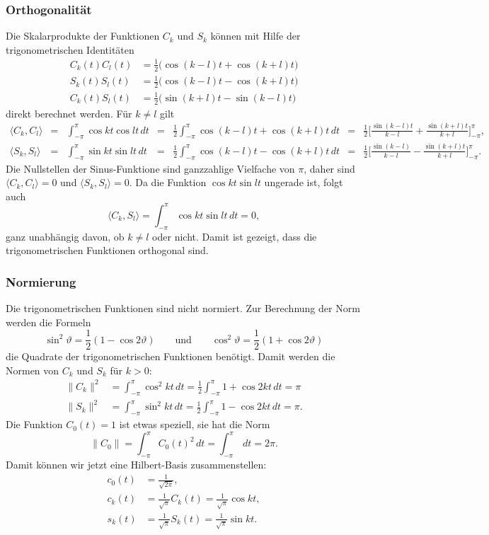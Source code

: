 \subsubsection{Orthogonalität}
Die Skalarprodukte der Funktionen $C_k$ und $S_k$ können mit Hilfe
der trigonometrischen Identitäten
\begin{align*}
C_k(t)C_l(t)
&=
\frac12\bigl(\cos(k-l)t+\cos(k+l)t\bigr)
\\
S_k(t)S_l(t)
&=
\frac12\bigl(\cos(k-l)t-\cos(k+l)t\bigr)
\\
C_k(t)S_l(t)
&=
\frac12\bigl(\sin(k+l)t-\sin(k-l)t\bigr)
\end{align*}
direkt berechnet werden.
Für $k\ne l$ gilt
\[
\renewcommand\arraycolsep{2pt}
\renewcommand\arraystretch{2.2}
\begin{array}{lclclcl}
\langle C_k,C_l\rangle
&=&
\displaystyle
\int_{-\pi}^\pi \cos kt\cos lt\,dt
&=&
\displaystyle
\frac12
\int_{-\pi}^\pi \cos(k-l)t+\cos(k+l)t\,dt
&=&
\displaystyle
\frac12\biggl[
\frac{\sin(k-l)t}{k-l} + \frac{\sin(k+l)t}{k+l}
\biggr]_{-\pi}^\pi,
\\
\langle S_k,S_l\rangle
&=&
\displaystyle
\int_{-\pi}^\pi \sin kt\sin lt\,dt
&=&
\displaystyle
\frac12
\int_{-\pi}^\pi \cos(k-l)t-\cos(k+l)t\,dt
&=&
\displaystyle
\frac12
\biggl[
\frac{\sin(k-l)}{k-l}-\frac{\sin(k+l)t}{k+l}
\biggr]_{-\pi}^\pi.
\end{array}
\]
Die Nullstellen der Sinus-Funktione sind ganzzahlige Vielfache von $\pi$,
daher sind $\langle C_k,C_l\rangle=0$ und $\langle S_k,S_l\rangle = 0$.
Da die Funktion $\cos kt \sin lt$ ungerade ist, folgt auch
\[
\langle C_k,S_l\rangle
=
\int_{-\pi}^\pi \cos kt\sin lt\,dt
=
0,
\]
ganz unabhängig davon, ob $k\ne l$ oder nicht.
Damit ist gezeigt, dass die trigonometrischen Funktionen orthogonal sind.

%
%
\subsubsection{Normierung}
Die trigonometrischen Funktionen sind nicht normiert.
Zur Berechnung der Norm werden die Formeln 
\[
\sin^2\vartheta = \frac12(1-\cos2\vartheta)
\qquad\text{und}\qquad
\cos^2\vartheta = \frac12(1+\cos2\vartheta)
\]
die Quadrate der trigonometrischen Funktionen benötigt.
Damit werden die Normen von $C_k$ und $S_k$ für $k>0$:
\begin{align*}
\|C_k\|^2
&=
\int_{-\pi}^\pi \cos^2kt\,dt
=
\frac12\int_{-\pi}^\pi 1+\cos 2kt\,dt
=
\pi
\\
\|S_k\|^2
&=
\int_{-\pi}^\pi \sin^2kt\,dt
=
\frac12\int_{-\pi}^\pi 1-\cos 2kt\,dt
=
\pi.
\end{align*}
Die Funktion $C_0(t)=1$ ist etwas speziell, sie hat die Norm
\[
\|C_0\|
=
\int_{-\pi}^\pi C_0(t)^2\,dt
=
\int_{-\pi}^\pi \,dt
=
2\pi.
\]
Damit können wir jetzt eine Hilbert-Basis zusammenstellen:
\[
\begin{aligned}
c_0(t) &= \frac{1}{\!\sqrt{2\pi}},\\
c_k(t) &= \frac{1}{\!\sqrt{\pi}} C_k(t) = \frac{1}{\!\sqrt{\pi}} \cos kt,\\
s_k(t) &= \frac{1}{\!\sqrt{\pi}} S_k(t) = \frac{1}{\!\sqrt{\pi}} \sin kt.\\
\end{aligned}
\]

